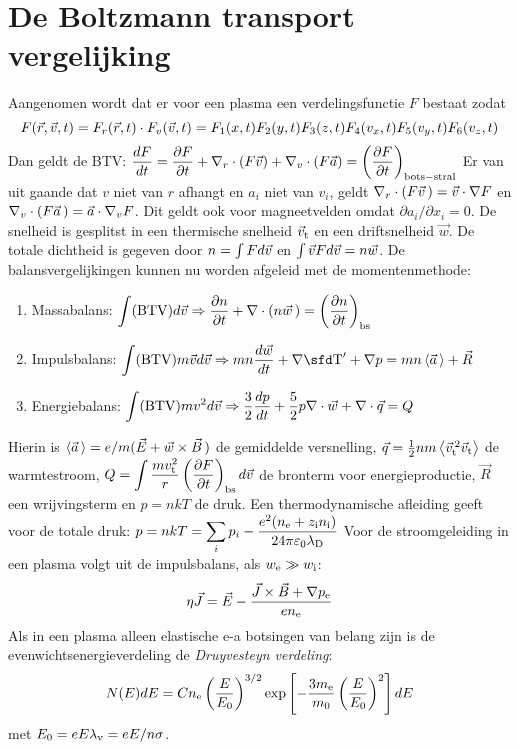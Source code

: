 \section{De Boltzmann transport vergelijking}
Aangenomen wordt dat er voor een plasma een verdelingsfunctie $F$ bestaat zodat
\[
F(\rr,\vv,t)=F_r(\rr,t)\cdot F_v(\vv,t)=F_1(x,t)F_2(y,t)F_3(z,t)F_4(v_x,t)F_5(v_y,t)F_6(v_z,t)
\]
Dan geldt de BTV:
$\displaystyle
\frac{dF}{dt}=\Q{F}{t}+\nabla_r\cdot(F\vv)+\nabla_v\cdot(F\aaa)=\Qc{F}{t}{\rm bots-stral}
$
\npar
Er van uit gaande dat $v$ niet van $r$ afhangt en $a_i$ niet van $v_i$, geldt
$\nabla_r\cdot(F\vv\,)=\vv\cdot\nabla F$ en
$\nabla_v\cdot(F\aaa\,)=\aaa\cdot\nabla_vF$. Dit geldt ook voor magneetvelden
omdat $\partial a_i/\partial x_i=0$. De snelheid is gesplitst in een
thermische snelheid $\vv_{\rm t}$ en een driftsnelheid $\vec{w}$. De totale
dichtheid is gegeven door $n=\int Fd\vv$ en $\int\vv Fd\vv=n\vec{w}$.
\npar
De balansvergelijkingen kunnen nu worden afgeleid met de momentenmethode:
\begin{enumerate}
\item Massabalans: $\displaystyle\int({\rm BTV})d\vv\Rightarrow\Q{n}{t}+\nabla\cdot(n\vvec{w})=\Qc{n}{t}{\rm bs}$
\item Impulsbalans: $\displaystyle\int({\rm BTV})m\vv d\vv\Rightarrow mn\frac{d\vec{w}}{dt}+\nabla \TT'+\nabla p=mn\av{\aaa\,}+\vec{R}$
\item Energiebalans: $\displaystyle\int({\rm BTV})mv^2d\vv\Rightarrow\frac{3}{2}\frac{dp}{dt}+\frac{5}{2}p\nabla\cdot\vec{w}+\nabla\cdot\vec{q}=Q$
\end{enumerate}
Hierin is $\av{\aaa\,}=e/m(\vec{E}+\vec{w}\times\vvec{B})$ de gemiddelde
versnelling, $\vec{q}=\half nm\av{\vv_{\rm t}^{\,2}\vv_{\rm t}}$ de warmtestroom,
$\displaystyle Q=\int\frac{mv_{\rm t}^2}{r}\Qc{F}{t}{\rm bs}d\vv$ de bronterm
voor energieproductie, $\vec{R}$ een wrijvingsterm en $p=nkT$ de druk.
\npar
Een thermodynamische afleiding geeft voor de totale druk:
$\displaystyle p=nkT=\sum_ip_i-\frac{e^2(\ne+z_{\rm i}\ni)}{24\pi\varepsilon_0\lambda_{\rm D}}$
\npar
Voor de stroomgeleiding in een plasma volgt uit de impulsbalans, als
$w_{\rm e}\gg w_{\rm i}$:
\[
\eta\vec{J}=\vec{E}-\frac{\vec{J}\times\vec{B}+\nabla p_{\rm e}}{e\ne}
\]
Als in een plasma alleen elastische e-a botsingen van belang zijn is de
evenwichtsenergieverdeling de {\it Druyvesteyn verdeling}:
\[
N(E)dE=C\ne\left(\frac{E}{E_0}\right)^{3/2}\exp\left[-\frac{3\me}{m_0}\left(\frac{E}{E_0}\right)^2\right]dE
\]
met $E_0=eE\lambda_{\rm v}=eE/n\sigma$.


